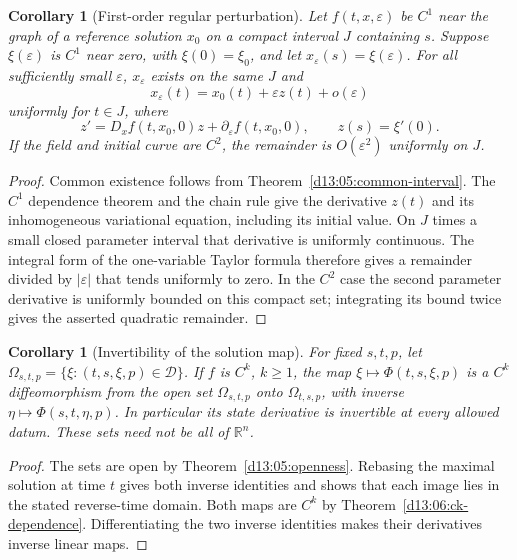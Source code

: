 \documentclass[11pt,oneside]{book}
\newtheorem{corollary}[theorem]{Corollary}
\theoremstyle{definition}
\theoremstyle{remark}\newtheorem{remark}[theorem]{Remark}
\newcommand{\R}{\mathbb R}\newcommand{\C}{\mathbb C}
\begin{document}
\begin{corollary}[First-order regular perturbation]\label{d13:06:perturbation-expansion}
Let $f(t,x,\varepsilon)$ be $C^1$ near the graph of a reference
solution $x_0$ on a compact interval $J$ containing $s$. Suppose
$\xi(\varepsilon)$ is $C^1$ near zero, with $\xi(0)=\xi_0$, and
let $x_\varepsilon(s)=\xi(\varepsilon)$. For all sufficiently small
$\varepsilon$, $x_\varepsilon$ exists on the same $J$ and
\[
 x_\varepsilon(t)=x_0(t)+\varepsilon z(t)+o(\varepsilon)
\]
uniformly for $t\in J$, where
\[
 z'=D_xf(t,x_0,0)z+\partial_\varepsilon f(t,x_0,0),
 \qquad z(s)=\xi'(0).
\]
If the field and initial curve are $C^2$, the remainder is
$O(\varepsilon^2)$ uniformly on $J$.
\end{corollary}
\begin{proof}
Common existence follows from Theorem~\ref{d13:05:common-interval}.
The $C^1$ dependence theorem and the chain rule give the derivative
$z(t)$ and its inhomogeneous variational equation, including its initial
value. On $J$ times a small closed parameter interval that derivative
is uniformly continuous. The integral form of the one-variable Taylor
formula therefore gives a remainder divided by $|\varepsilon|$ that
tends uniformly to zero. In the $C^2$ case the second parameter
derivative is uniformly bounded on this compact set; integrating its
bound twice gives the asserted quadratic remainder.
\end{proof}

\begin{corollary}[Invertibility of the solution map]\label{d13:06:local-diffeomorphism}
For fixed $s,t,p$, let
$\Omega_{s,t,p}=\{\xi:(t,s,\xi,p)\in\mathcal D\}$. If $f$ is
$C^k$, $k\geq1$, the map
$\xi\mapsto\Phi(t,s,\xi,p)$ is a $C^k$ diffeomorphism from the
open set $\Omega_{s,t,p}$ onto $\Omega_{t,s,p}$, with inverse
$\eta\mapsto\Phi(s,t,\eta,p)$. In particular its state derivative
is invertible at every allowed datum. These sets need not be all of
$\R^n$.
\end{corollary}
\begin{proof}
The sets are open by Theorem~\ref{d13:05:openness}. Rebasing the
maximal solution at time $t$ gives both inverse identities and shows
that each image lies in the stated reverse-time domain. Both maps are
$C^k$ by Theorem~\ref{d13:06:ck-dependence}. Differentiating the two
inverse identities makes their derivatives inverse linear maps.
\end{proof}
\end{document}

